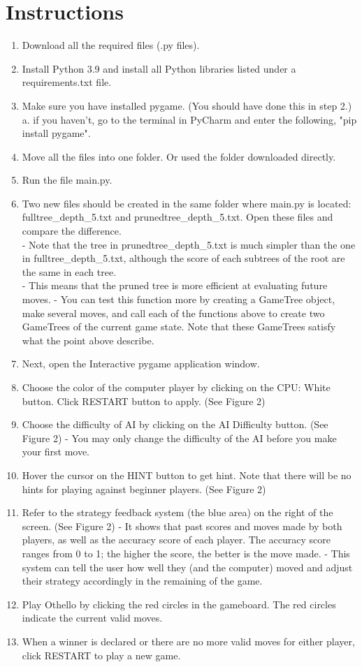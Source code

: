 \documentclass[fontsize=11pt]{article}
\begin{document}
\section*{Instructions}
\begin{enumerate}
    \item Download all the required files (.py files).
    \item Install Python 3.9 and install all Python libraries listed under a requirements.txt file.
    \item Make sure you have installed pygame. (You should have done this in step 2.)
    \subitem a. if you haven't, go to the terminal in PyCharm and enter the following, "pip install pygame". 
    \item Move all the files into one folder. Or used the folder downloaded directly.
    \item Run the file main.py.
    \item Two new files should be created in the same folder where main.py is located: fulltree\_depth\_5.txt and prunedtree\_depth\_5.txt. Open these files and compare the difference.\\
    \subitem - Note that the tree in prunedtree\_depth\_5.txt is much simpler than the one in fulltree\_depth\_5.txt, although the score of each subtrees of the root are the same in each tree.\\
    \subitem - This means that the pruned tree is more efficient at evaluating future moves.
    \subitem - You can test this function more by creating a GameTree object, make several moves, and call each of the functions above to create two GameTrees of the current game state. Note that these GameTrees satisfy what the point above describe.
    \item Next, open the Interactive pygame application window.
    \item Choose the color of the computer player by clicking on the CPU: White button. Click RESTART button to apply. (See Figure 2)
    \item Choose the difficulty of AI by clicking on the AI Difficulty button. (See Figure 2)
    \subitem - You may only change the difficulty of the AI before you make your first move.
    \item Hover the cursor on the HINT button to get hint. Note that there will be no hints for playing against beginner players. (See Figure 2)
    \item Refer to the strategy feedback system (the blue area) on the right of the screen. (See Figure 2)
    \subitem - It shows that past scores and moves made by both players, as well as the accuracy score of each player. The accuracy score ranges from 0 to 1; the higher the score, the better is the move made. 
    \subitem - This system can tell the user how well they (and the computer) moved and adjust their strategy accordingly in the remaining of the game.
    \item Play Othello by clicking the red circles in the gameboard. The red circles indicate the current valid moves.
    \item When a winner is declared or there are no more valid moves for either player, click RESTART to play a new game.
\end{enumerate} 
\end{document}
